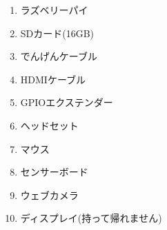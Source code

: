 \documentclass[a4paper,12pt]{jarticle}
\begin{document}
\bigskip

\begin{enumerate}
  \item ラズベリーパイ
  \item SDカード(16GB)
  \item でんげんケーブル
  \item HDMIケーブル
  \item GPIOエクステンダー
  \item ヘッドセット
  \item マウス
  \item センサーボード
  \item ウェブカメラ
  \item ディスプレイ(持って帰れません)
\end{enumerate}
\clearpage
\end{document}
